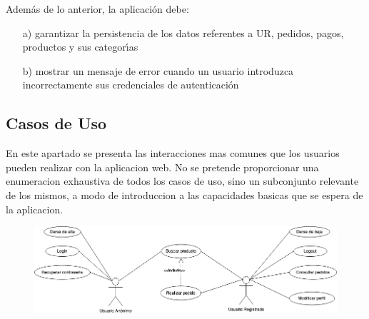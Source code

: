 \documentclass[a4paper]{report}
\begin{document}
            Adem\'as de lo anterior, la aplicaci\'on debe:
            \begin{enumerate}
                \item[a)] garantizar la persistencia de los datos referentes a UR, pedidos, pagos, productos y sus categor\'\i{}as
                \item[b)] mostrar un mensaje de error cuando un usuario introduzca incorrectamente sus credenciales de autenticaci\'on
            \end{enumerate}

        \subsection{Casos de Uso}
            En este apartado se presenta las interacciones mas comunes que los usuarios pueden realizar con la aplicacion web.
            No se pretende proporcionar una enumeracion exhaustiva de todos los casos de uso, sino un subconjunto relevante
            de los mismos, a modo de introduccion a las capacidades basicas que se espera de la aplicacion.

            \begin{figure}[h]
                \centering
                \includegraphics[width=\textwidth]{Use-Case_Diagram}
            \end{figure}
\end{document}
